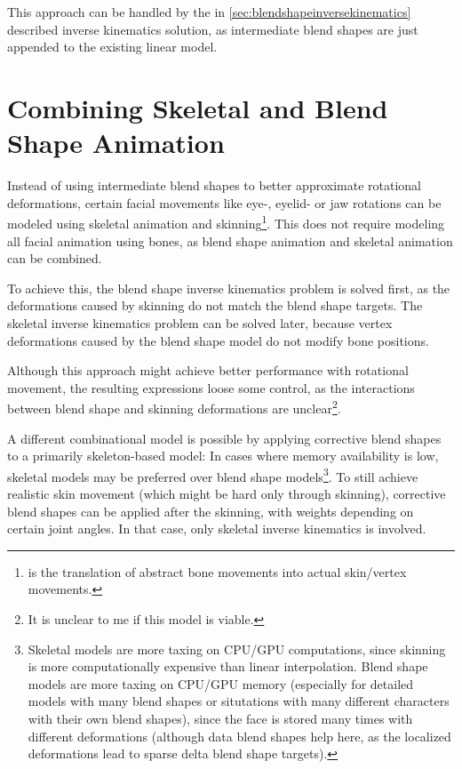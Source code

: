 This approach can be handled by the in \autoref{sec:blendshapeinversekinematics} described inverse kinematics solution,
as intermediate blend shapes are just appended to the existing linear model.

\section{Combining Skeletal and Blend Shape Animation}
\label{sec:combiningskeletalandblendshapes}

Instead of using intermediate blend shapes to better approximate rotational deformations,
certain facial movements like eye-, eyelid- or jaw rotations can be modeled using skeletal animation and skinning\footnote{
   is the translation of abstract bone movements into actual skin/vertex movements.
}.
This does not require modeling all facial animation using bones,
as blend shape animation and skeletal animation can be combined.

To achieve this, the blend shape inverse kinematics problem is solved first,
as the deformations caused by skinning do not match the blend shape targets.
The skeletal inverse kinematics problem can be solved later,
because vertex deformations caused by the blend shape model do not modify bone positions.

Although this approach might achieve better performance with rotational movement,
the resulting expressions loose some control,
as the interactions between blend shape and skinning deformations are unclear\footnote{
  It is unclear to me if this model is viable.
}.

A different combinational model is possible by applying corrective blend shapes to a primarily skeleton-based model:
In cases where memory availability is low,
skeletal models may be preferred over blend shape models\footnote{
  Skeletal models are more taxing on CPU/GPU computations,
  since skinning is more computationally expensive than linear interpolation.
  Blend shape models are more taxing on CPU/GPU memory (especially for detailed models with many blend shapes or situtations with many different characters with their own blend shapes),
  since the face is stored many times with different deformations (although data blend shapes help here, as the localized deformations lead to sparse delta blend shape targets).
}.
To still achieve realistic skin movement (which might be hard only through skinning),
corrective blend shapes can be applied after the skinning,
with weights depending on certain joint angles.
In that case, only skeletal inverse kinematics is involved.
